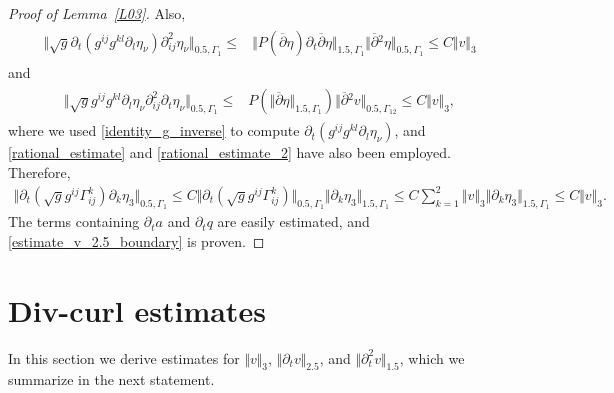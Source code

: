 \documentclass[10pt,reqno]{amsart}
\theoremstyle{plain}
\theoremstyle{definition}
\numberwithin{equation}{section}
\newcommand{\Ga}{\Gamma}
\newcommand{\norm}[1]{\Vert#1\Vert}
\begin{document}
{\begin{proof}[Proof of Lemma~\ref{L03}]
Also,
\begin{align}
\begin{split}
\norm{\sqrt{g} \partial_t( g^{ij} g^{kl} \partial_l \eta_\nu ) \partial^2_{ij} \eta_\nu }_{0.5,\Ga_1} 
\leq &
\norm{ P(\overline{\partial} \eta ) \partial_t \overline{\partial} \eta }_{1.5,\Ga_1} 
\norm{\overline{\partial}{}^2 \eta}_{0.5,\Ga_1}
\leq C \norm{v}_3
\end{split}
\nonumber
\end{align}
and
\begin{align}
\begin{split}
\norm{\sqrt{g} g^{ij} g^{kl} \partial_l \eta_\nu \partial^2_{ij} \partial_t \eta_\nu}_{0.5,\Ga_1} 
\leq & P(\norm{\overline{\partial} \eta }_{1.5,\Ga_1} ) \norm{ \overline{\partial}{}^2 v}_{0.5,\Ga_12}
\leq  C \norm{v}_3,
\end{split}
\nonumber
\end{align}
where we used  \eqref{identity_g_inverse} to compute $ \partial_t( g^{ij} g^{kl} \partial_l \eta_\nu ) $,
and  \eqref{rational_estimate} and \eqref{rational_estimate_2} have  also been employed.
Therefore,
\begin{gather}
\norm{ \partial_t (\sqrt{g} g^{ij}  \Ga_{ij}^k ) \partial_k \eta_3 }_{0.5,\Ga_1}
\leq C \norm{ \partial_t (\sqrt{g} g^{ij}  \Ga_{ij}^k )  }_{0.5,\Ga_1} \norm{ \partial_k \eta_3 }_{1.5,\Ga_1}
\leq C \sum_{k=1}^2 \norm{v}_3 \norm{ \partial_k \eta_3 }_{1.5,\Ga_1}
\leq C \norm{v}_3
.
\nonumber
\end{gather}
The terms containing $\partial_t a$ and $\partial_t q$ are easily
estimated, and 
\eqref{estimate_v_2.5_boundary} is proven.
\end{proof}





\section{Div-curl estimates\label{section_div_curl}}
In this section we derive estimates for $\norm{v}_3$, 
$\norm{\partial_t v}_{2.5}$, and $\norm{\partial^2_t v}_{1.5}$,
which we summarize in the next statement.

}
\end{document}

